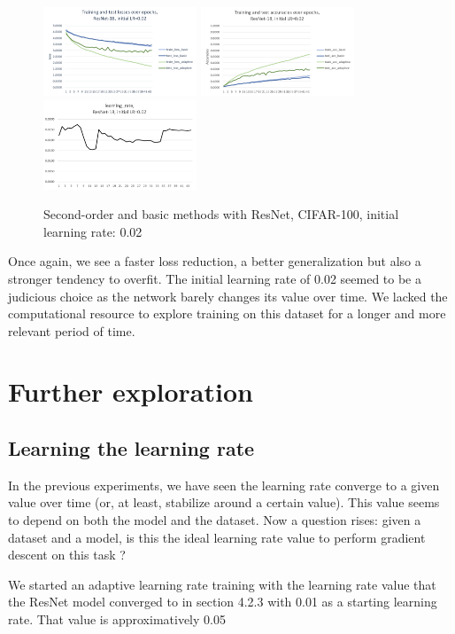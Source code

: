 \documentclass{article}
\begin{document}
  \begin{figure}[!h]
	\includegraphics[width=130pt]{loss_resnet_100_0_02.png}
	\includegraphics[width=130pt]{acc_resnet_100_0_02.png}
	\includegraphics[width=130pt]{lr_resnet_100_0_02.png}
	\caption{Second-order and basic methods with ResNet, CIFAR-100, initial learning rate: 0.02}
  \end{figure}
  
  Once again, we see a faster loss reduction, a better generalization but also a stronger tendency to overfit. The initial learning rate of 0.02 seemed to be a judicious choice as the network barely changes its value over time. We lacked the computational resource to explore training on this dataset for a longer and more relevant period of time. 
  
  \section{Further exploration}
  
  \subsection{Learning the learning rate}
  
  In the previous experiments, we have seen the learning rate converge to a given value over time (or, at least, stabilize around a certain value). This value seems to depend on both the model and the dataset. Now a question rises: given a dataset and a model, is this the ideal learning rate value to perform gradient descent on this task ?
  
  We started an adaptive learning rate training with the learning rate value that the ResNet model converged to in section 4.2.3 with 0.01 as a starting learning rate. That value is approximatively 0.05
  
\end{document}
